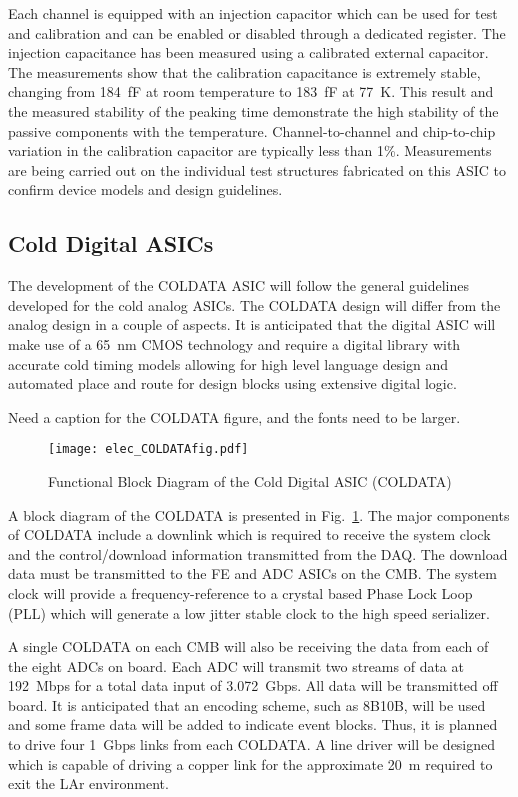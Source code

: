 Each channel is equipped with an injection capacitor which can be used
for test and calibration and can be enabled or disabled through a
dedicated register. The injection capacitance has been measured using 
a calibrated external capacitor. The measurements show
that the calibration capacitance is extremely stable, changing from
184~fF at room temperature to 183~fF at 77~K. This result and the measured
stability of the peaking time demonstrate the high stability of the
passive components with the temperature. Channel-to-channel and chip-to-chip
variation in the calibration capacitor are typically less than 1\%. Measurements are being carried
out on the individual test structures fabricated on this ASIC to
confirm device models and design guidelines.

%
\subsection{Cold Digital ASICs}
\label{subsec:fe-CMOS-digital}

The development of the COLDATA ASIC will follow the general guidelines developed for the cold analog ASICs.
The COLDATA design will differ from the analog design in a couple of aspects.
It is anticipated that the digital ASIC will make use of a 65~nm CMOS technology and require a
digital library with accurate cold timing models allowing for high level language design and
automated place and route for design blocks using extensive digital logic.  

\begin{editornote}
  Need a caption for the COLDATA figure, and the fonts need to be larger.
\end{editornote}
\begin{figure}[htbp]
\centering
\texttt{[image: elec\_COLDATAfig.pdf]}
\caption{Functional Block Diagram of the Cold Digital ASIC (COLDATA)}
\label{fig:elec_COLDATAfig}
\end{figure}
A block diagram of the COLDATA is presented in Fig.~\ref{fig:elec_COLDATAfig}.
The major components of COLDATA include a downlink which is required to receive the system clock and
the control/download information transmitted from the DAQ.
The download data must be transmitted to the FE and ADC ASICs on the CMB.
The system clock will provide a frequency-reference to a crystal based Phase Lock Loop (PLL)
which will generate a low jitter stable clock to the high speed serializer. 

A single COLDATA on each CMB will also be receiving the data from each of the eight ADCs on board.
Each ADC will transmit two streams of data at 192~Mbps for a total data input of 3.072~Gbps.
All data will be transmitted off board.
It is anticipated that an encoding scheme, such as 8B10B, will be used and
some frame data will be added to indicate event blocks.
Thus, it is planned to drive four 1~Gbps links from each COLDATA.
A line driver will be designed which is capable of driving a copper link for the approximate 20~m required
to exit the LAr environment. 

